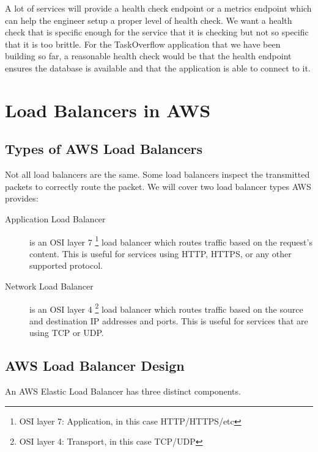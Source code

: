 \documentclass{csse4400}
\begin{document}

A lot of services will provide a health check endpoint or a metrics endpoint which can help the engineer setup a proper level of health check.
We want a health check that is specific enough for the service that it is checking but not so specific that it is too brittle.
For the TaskOverflow application that we have been building so far,
a reasonable health check would be that the health endpoint ensures the database is available and that the application is able to connect to it.

\section{Load Balancers in AWS}

\subsection{Types of AWS Load Balancers}
Not all load balancers are the same.
Some load balancers inspect the transmitted packets to correctly route the packet.
We will cover two load balancer types AWS provides:

\begin{description}
  \item[Application Load Balancer] is an OSI layer 7%
\footnote{OSI layer 7: Application, in this case HTTP/HTTPS/etc}
load balancer which routes traffic based on the request's content.
      This is useful for services using HTTP, HTTPS, or any other supported protocol.
  \item[Network Load Balancer] is an OSI layer 4%
\footnote{OSI layer 4: Transport, in this case TCP/UDP}
load balancer which routes traffic based on the source and destination IP addresses and ports.
This is useful for services that are using TCP or UDP.
\end{description}

\subsection{AWS Load Balancer Design}

An AWS Elastic Load Balancer has three distinct components. 
\end{document}
